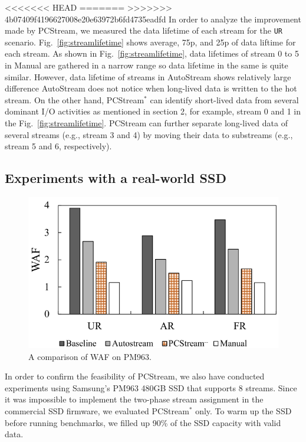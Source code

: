 <<<<<<< HEAD
=======
>>>>>>> 4b07409f4196627008e20e63972b6fd4735eadfd
In order to analyze the improvement made by {\sf PCStream}, 
we measured the data lifetime of each stream for the {\tt UR} scenario.
Fig.~\ref{fig:streamlifetime} shows average, 75p, and 25p of data liftime 
for each stream.
As shown in Fig.~\ref{fig:streamlifetime}, data lifetimes of stream 0 to 5
in \textsf{Manual} are gathered in a narrow range so data lifetime in
the same is quite similar.
However, data lifetime of streams in \textsf{AutoStream} shows relatively large difference
\textsf{AutoStream} does not notice when long-lived data is written to
the hot stream.
On the other hand, {\sf PCStream$^*$} can identify short-lived data from 
several dominant I/O activities as mentioned 
in section 2, for example, stream 0 and 1 in the Fig.~\ref{fig:streamlifetime}.
\textsf{PCStream} can further separate long-lived data of several streams 
(e.g., stream 3 and 4)
by moving their data to substreams (e.g., stream 5 and 6, respectively). 

\vspace{-10pt}
\subsection{Experiments with a real-world SSD}

\begin{figure}[t]
	\centering
	\includegraphics[width=0.8\linewidth]{figure/result_ssd}
	\vspace{-10pt}
	\caption{A comparison of WAF on PM963.}
	\label{fig:result_SSD}
	\vspace{-15pt}
\end{figure}

In order to confirm the feasibility of \textsf{PCStream}, we also have
conducted experiments using Samsung's PM963 480GB SSD that supports 8 streams.
Since it was impossible to implement the two-phase stream assignment in the
commercial SSD firmware, we evaluated {\sf PCStream$^*$} only.  To warm up the
SSD before running benchmarks, we filled up 90\% of the SSD capacity with valid
data.

